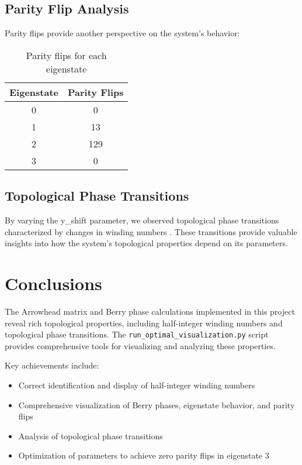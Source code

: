 \documentclass{article}
\begin{document}
\subsection{Parity Flip Analysis}

Parity flips provide another perspective on the system's behavior:

\begin{table}[H]
\centering
\begin{tabular}{|c|c|}
\hline
Eigenstate & Parity Flips \\
\hline
0 & 0 \\
1 & 13 \\
2 & 129 \\
3 & 0 \\
\hline
\end{tabular}
\caption{Parity flips for each eigenstate}
\end{table}

\subsection{Topological Phase Transitions}

By varying the y\_shift parameter, we observed topological phase transitions characterized by changes in winding numbers \cite{Liang2015, Park2011}. These transitions provide valuable insights into how the system's topological properties depend on its parameters.

\section{Conclusions}

The Arrowhead matrix and Berry phase calculations implemented in this project reveal rich topological properties, including half-integer winding numbers and topological phase transitions. The \texttt{run\_optimal\_visualization.py} script provides comprehensive tools for visualizing and analyzing these properties.

Key achievements include:

\begin{itemize}
    \item Correct identification and display of half-integer winding numbers
    \item Comprehensive visualization of Berry phases, eigenstate behavior, and parity flips
    \item Analysis of topological phase transitions
    \item Optimization of parameters to achieve zero parity flips in eigenstate 3
\end{itemize}
\end{document}
